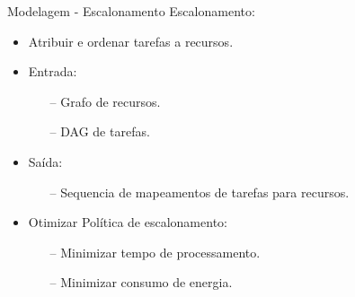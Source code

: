 \begin{frame}{Modelagem - Escalonamento}
    Escalonamento:
    \begin{itemize}
        \item Atribuir e ordenar tarefas a recursos.
        \item Entrada:
        \begin{itemize}
            \item[--] Grafo de recursos.
            \item[--] DAG de tarefas.
        \end{itemize}
        \item Saída:
        \begin{itemize}
            \item[--] Sequencia de mapeamentos de tarefas para recursos.
        \end{itemize}
        \item Otimizar Política de escalonamento:
        \begin{itemize}
            \item[--] Minimizar tempo de processamento.
            \item[--] Minimizar consumo de energia.
        \end{itemize}
    \end{itemize}
\end{frame}